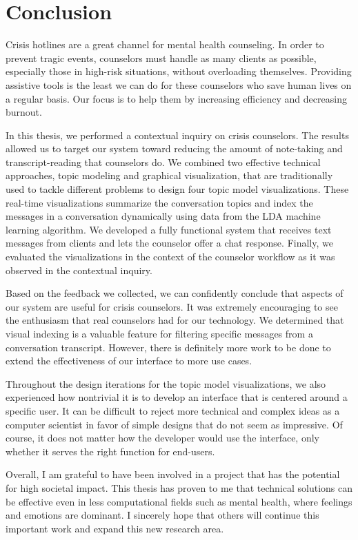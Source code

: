 \chapter{Conclusion}

Crisis hotlines are a great channel for mental health counseling. In order to prevent
tragic events, counselors must handle as many clients as possible, especially those in
high-risk situations, without overloading themselves. Providing assistive tools is the
least we can do for these counselors who save human lives on a regular basis. Our
focus is to help them by increasing efficiency and decreasing burnout.

In this thesis, we performed a contextual inquiry on crisis counselors. The
results allowed us to target our system toward reducing the amount of note-taking
and transcript-reading that counselors do. We combined two effective technical
approaches, topic modeling and graphical visualization, that are traditionally used to
tackle different problems to design four topic model visualizations. These real-time
visualizations summarize the conversation topics and index the messages in a
conversation dynamically using data from the LDA machine learning algorithm. We
developed a fully functional system that receives text messages from clients and lets
the counselor offer a chat response. Finally, we evaluated the visualizations in the
context of the counselor workflow as it was observed in the contextual inquiry.

Based on the feedback we collected, we can confidently conclude that aspects of
our system are useful for crisis counselors. It was extremely encouraging to see the
enthusiasm that real counselors had for our technology. We determined that visual
indexing is a valuable feature for filtering specific messages from a conversation
transcript. However, there is definitely more work to be done to extend the effectiveness
of our interface to more use cases.

Throughout the design iterations for the topic model visualizations, we also
experienced how nontrivial it is to develop an interface that is centered around a specific
user. It can be difficult to reject more technical and complex ideas as a computer
scientist in favor of simple designs that do not seem as impressive. Of course, it does
not matter how the developer would use the interface, only whether it serves the right
function for end-users.

Overall, I am grateful to have been involved in a project that has the potential
for high societal impact.  This thesis has proven to me that technical solutions can
be effective even in less computational fields such as mental health, where feelings
and emotions are dominant. I sincerely hope that others will continue this important
work and expand this new research area.
